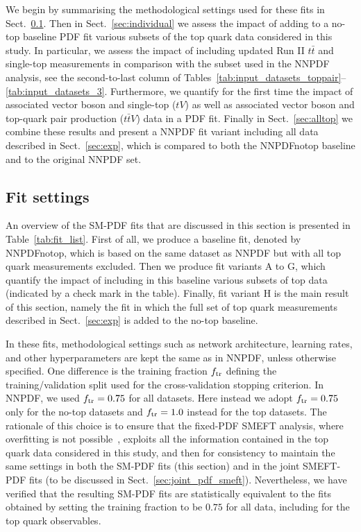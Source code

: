 \documentclass[withindex,glossary]{cam-thesis}
\begin{document}
We begin by summarising the methodological settings used for these
fits in Sect.~\ref{sec:setting}.
%
Then in Sect.~\ref{sec:individual} we assess the impact of adding to
a no-top baseline PDF fit various subsets of the top quark data
considered in this study. 
%
In particular, we assess the impact of including updated Run II $t\bar{t}$
and single-top measurements in comparison
with the subset used in the NNPDF analysis, see the second-to-last
column of Tables~\ref{tab:input_datasets_toppair}--
\ref{tab:input_datasets_3}.
%
Furthermore, we quantify for the first time the impact of
associated vector boson and single-top ($tV$) as well as associated vector boson and
top-quark pair production ($t \bar{t} V$) data in a PDF fit.
%
Finally in Sect.~\ref{sec:alltop} we combine these results and present a
NNPDF fit variant including all data described in Sect.~\ref{sec:exp},
which is compared to both the NNPDFnotop baseline and to the original
NNPDF set.

\subsection{Fit settings}
\label{sec:setting}

An overview of the SM-PDF fits that are discussed in this section is
presented in Table~\ref{tab:fit_list}. 
%
First of all, we produce a baseline fit, denoted
by NNPDFnotop, which is based on the same dataset as NNPDF
but with all top quark measurements excluded.
%
Then we produce fit variants A to G, which quantify the impact of
including in this baseline various subsets of
top data (indicated by a check mark in the table).
%
Finally, fit variant H is the main result of this section, namely the fit
in which the full set of top quark measurements described in
Sect.~\ref{sec:exp} is added to the no-top baseline.

In these fits, methodological settings such as network architecture,
learning rates, and other hyperparameters are kept the same as in
NNPDF, unless otherwise specified.
One difference is the training fraction $f_{\rm tr}$ defining
the training/validation split used for the cross-validation stopping criterion.
 In NNPDF, we used $f_{\rm tr}=0.75$  for all datasets.
 Here instead we adopt $f_{\rm tr}=0.75$ only for the no-top datasets
 and $f_{\rm tr}=1.0$ instead for the top datasets.
 The rationale of this choice is to ensure that the fixed-PDF 
 SMEFT analysis, where overfitting is not possible~\cite{Ethier:2021bye},
 exploits all the information contained in the top quark data considered
 in this study,  and then for consistency to maintain the same settings in
 both the SM-PDF fits (this section) and
 in the joint SMEFT-PDF fits (to be discussed in Sect.~\ref{sec:joint_pdf_smeft}).
%
 Nevertheless, we have verified that the resulting SM-PDF fits are statistically equivalent to the fits obtained by setting the training fraction to be $0.75$ for all data, including for the top quark observables.
\end{document}
